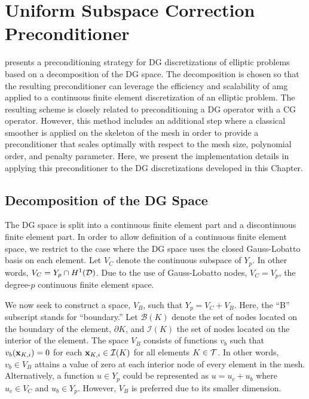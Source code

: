 \documentclass[../doc.tex]{subfiles}
\begin{document}
\section{Uniform Subspace Correction Preconditioner} \label{dgvef_sec:subspace}
\textcite{Pazner2021} presents a preconditioning strategy for DG discretizations of elliptic problems based on a decomposition of the DG space. The decomposition is chosen so that the resulting preconditioner can leverage the efficiency and scalability of \gls{amg} applied to a continuous finite element discretization of an elliptic problem. The resulting scheme is closely related to preconditioning a DG operator with a CG operator. However, this method includes an additional step where a classical smoother is applied on the skeleton of the mesh in order to provide a preconditioner that scales optimally with respect to the mesh size, polynomial order, and penalty parameter. Here, we present the implementation details in applying this preconditioner to the DG discretizations developed in this Chapter. 

\subsection{Decomposition of the DG Space}
The DG space is split into a continuous finite element part and a discontinuous finite element part. In order to allow definition of a continuous finite element space, we restrict to the case where the DG space uses the closed Gauss-Lobatto basis on each element. Let $V_C$ denote the continuous subspace of $Y_p$. In other words, $V_C = Y_p \cap H^1(\mathcal{D})$. Due to the use of Gauss-Lobatto nodes, $V_C = V_p$, the degree-$p$ continuous finite element space. 

We now seek to construct a space, $V_B$, such that $Y_p = V_C + V_B$. Here, the ``B'' subscript stands for ``boundary.'' Let $\mathcal{B}(K)$ denote the set of nodes located on the boundary of the element, $\partial K$, and $\mathcal{I}(K)$ the set of nodes located on the interior of the element. The space $V_B$ consists of functions $v_b$ such that $v_b(\boldsymbol{\boldsymbol{\mathrm{x}}}_{K,i}) = 0$ for each $\boldsymbol{\boldsymbol{\mathrm{x}}}_{K,i} \in \mathcal{I}(K)$ for all elements $K \in \mathcal{T}$. In other words, $v_b \in V_B$ attains a value of zero at each interior node of every element in the mesh. 
Alternatively, a function $u \in Y_p$ could be represented as $u = u_c + u_b$ where $u_c \in V_C$ and $u_b \in Y_p$. However, $V_B$ is preferred due to its smaller dimension. 
\end{document}
